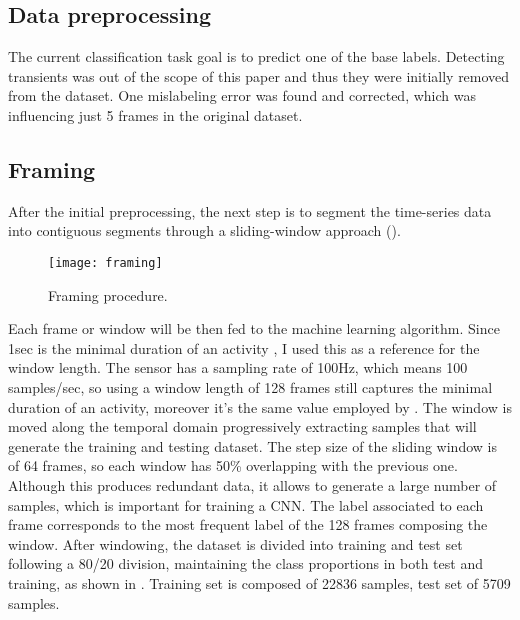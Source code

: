 \subsection{Data preprocessing}
\label{sec:data_preprocessing}
The current classification task goal is to predict one of the base labels. Detecting transients was out of the scope of this paper and thus they were initially removed from the dataset. One mislabeling error was found and corrected, which was influencing just 5 frames in the original dataset.

\subsection{Framing}
\label{sec:framing}
After the initial preprocessing, the next step is to segment the \mbox{time-series} data into contiguous segments through a \mbox{sliding-window} approach ().\\

\begin{figure}[h]
	\captionsetup{font=scriptsize, justification=centering}
    \centering
	\texttt{[image: framing]}
    \caption{Framing procedure.}
    \label{fig:img_framing}
\end{figure}

Each frame or window will be then fed to the machine learning algorithm. Since 1sec is the minimal duration of an activity \cite{base-paper}, I used this as a reference for the window length. The sensor has a sampling rate of 100Hz, which means 100 \mbox{samples/sec}, so using a window length of 128 frames still captures the minimal duration of an activity, moreover it's the same value employed by \cite{base-paper}. The window is moved along the temporal domain progressively extracting samples that will generate the training and testing dataset. The step size of the sliding window is of 64 frames, so each window has 50\% overlapping with the previous one. Although this produces redundant data, it allows to generate a large number of samples, which is important for training a CNN. The label associated to each frame corresponds to the most frequent label of the 128 frames composing the window.
After windowing, the dataset is divided into training and test set following a \mbox{80/20} division, maintaining the class proportions in both test and training, as shown in . Training set is composed of 22836 samples, test set of 5709 samples.

